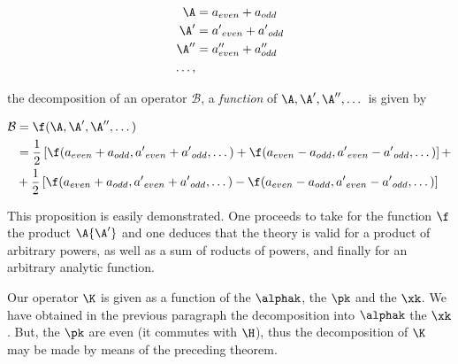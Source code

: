 \documentclass{article}
\newcommand{\nc}[2]{
  \newcommand{#1}{#2}
}
\newcommand{\uequ}[1]{
\begin{equation*}
#1
\end{equation*}
}
\newcommand{\var}[1]{#1}
\newcommand{\op}[1]{
\mathcal{#1}
}
\newcommand{\primed}[1]{{#1^{\prime}}}
\newcommand{\pprimed}[1]{{#1}^{\prime\prime}}
\newcommand{\inv}[1]{\frac{1}{#1}}
\renewcommand{\it}[1]{\textit{#1}}
\begin{document}
\nc{\B}{\op{B}}
\nc{\Ap}{\primed{\A}}
\nc{\App}{\pprimed{\A}}
\nc{\Aeven}{\var{a}_{even}}
\nc{\Aodd}{\var{a}_{odd}}

\nc{\Apeven}{\primed{\var{a}}_{even}}
\nc{\Apodd}{\primed{\var{a}}_{odd}}
\nc{\Appeven}{\pprimed{\var{a}}_{even}}
\nc{\Appodd}{\pprimed{\var{a}}_{odd}}

\nc{\Beven}{\var{b}_{even}}
\nc{\Bodd}{\var{b}_{odd}}

\uequ{
\begin{split}
\A &= \Aeven + \Aodd \\
\primed{\A} &= \Apeven + \Apodd\\
\pprimed{\A} &= \Appeven + \Appodd \\
\dots,
\end{split}
}
the decomposition of an operator $\B$, a \it{function} of $\A, \Ap, \App, \dots$ is given by
\uequ{
\begin{split}
\B &= \f(\A, \Ap, \App, \dots)\\
   &=\inv{2}\left[
   \f(\Aeven + \Aodd, \Apeven + \Apodd, \dots) + 
   \f(\Aeven - \Aodd, \Apeven - \Apodd, \dots)
 \right] + \\
 &+ \inv{2}\left[
   \f(\Aeven + \Aodd, \Apeven + \Apodd, \dots) -
   \f(\Aeven - \Aodd, \Apeven - \Apodd, \dots)
 \right]
\end{split}
}

This proposition is easily demonstrated. One proceeds to take for the function $\f$ the product $\A\Ap$ and one deduces that the theory is valid for a product of arbitrary powers, as well as a sum of 
roducts of powers, and finally for an arbitrary analytic function.

Our operator $\K$ is given as a function of the $\alphak$, the $\pk$ and the $\xk$. We have obtained in the previous paragraph the decomposition into $\alphak$ the $\xk$. But, the $\pk$ are even (it commutes with $\H$), thus the decomposition of $\K$ may be made by means of the preceding theorem.
\end{document}
